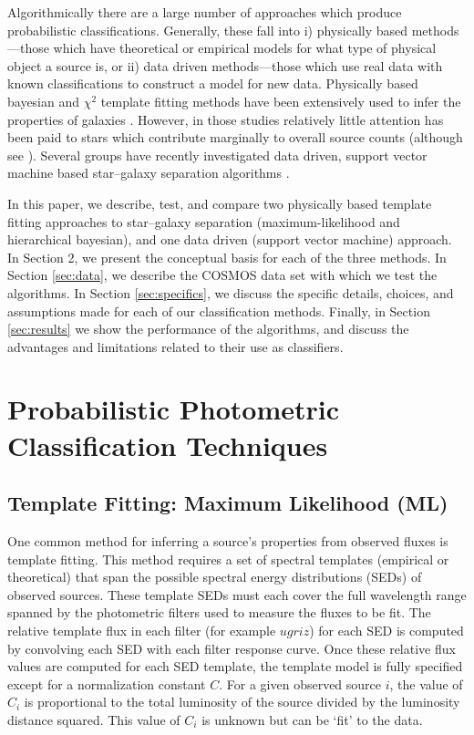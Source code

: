 \documentclass[12pt,preprint]{aastex}
\begin{document}
Algorithmically there are a large number of approaches which produce
probabilistic classifications.  Generally, these fall into i)
physically based methods---those which have theoretical or empirical
models for what type of physical object a source is, or ii) data
driven methods---those which use real data with known classifications
to construct a model for new data.  Physically based bayesian and
$\chi^2$ template fitting methods have been extensively used to infer
the properties of galaxies \citep[e.g.,][]{coil04a, ilbert09, xia09,
  walcher11a,hildebrandt10}. However, in those studies relatively
little attention has been paid to stars which contribute marginally to
overall source counts (although see \citealt{robin07}).  Several
groups have recently investigated data driven, support vector machine
based star--galaxy separation algorithms
\citep[e.g.,][]{saglia12,solarz12a,tsalmantza12a}.

In this paper, we describe, test, and compare two physically based
template fitting approaches to star--galaxy separation
(maximum-likelihood and hierarchical bayesian), and one data driven
(support vector machine) approach.  In Section 2, we present the
conceptual basis for each of the three methods.  In Section
\ref{sec:data}, we describe the COSMOS data set with which we test the
algorithms.  In Section \ref{sec:specifics}, we discuss the specific
details, choices, and assumptions made for each of our classification
methods. Finally, in Section \ref{sec:results} we show the performance
of the algorithms, and discuss the advantages and limitations related
to their use as classifiers.


%
%
\section{Probabilistic Photometric Classification Techniques}

\subsection{Template Fitting: Maximum Likelihood (ML)}
\label{ssec:MLmethod}

One common method for inferring a source's properties from
observed fluxes is template fitting.  This method requires a set of
spectral templates (empirical or theoretical) that span the possible
spectral energy distributions (SEDs) of observed sources.  These
template SEDs must each cover the full wavelength range spanned by the
photometric filters used to measure the fluxes to be fit.  The
relative template flux in each filter (for example $ugriz$) for each
SED is computed by convolving each SED with each filter response
curve.  Once these relative flux values are computed for
each SED template, the template model is fully specified except for a
normalization constant $C$.  For a given observed source $i$, the
value of $C_i$ is proportional to the total luminosity of the source
divided by the luminosity distance squared.  This value of $C_i$ is
unknown but can be `fit' to the data.
\end{document}
